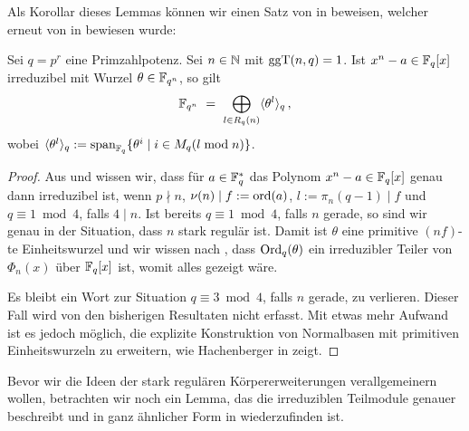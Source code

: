 Als Korollar dieses Lemmas können wir einen Satz von \citeauthor{semaev:1989}
\citeyear{semaev:1989} in 
\autocite{semaev:1989} beweisen, welcher erneut von \citeauthor{gao:1997}
\citeyear{gao:1997} in \autocite{gao:1997} bewiesen wurde:

\begin{satz}
  \label{satz:gao1}
  Sei $q = p^r$ eine Primzahlpotenz. Sei $n \in \mathbb{N}$ mit $\operatorname{ggT}(n,q)=1$.
  Ist $x^n - a \in \mathbb{F}_q[x]$ irreduzibel mit Wurzel $\theta\in \mathbb{F}_{q^n}$, so
  gilt 
  \[ \mathbb{F}_{q^n} \ =\  \bigoplus_{l\in R_q(n)} \langle \theta^l\rangle_q\,,\]
  wobei $\langle \theta^l\rangle_q := 
  \operatorname{span}_{\mathbb{F}_q}\{ \theta^i \mid i\in M_q(l\bmod n)\}$.
\end{satz}
\begin{proof}
  Aus  und 
  wissen wir, dass für $a \in \mathbb{F}_q^\ast$ das Polynom
  $x^n-a \in \mathbb{F}_q[x]$ genau dann irreduzibel ist, wenn
  $p\nmid n$, $\nu(n) \mid f := \operatorname{ord}(a)$, $l := \pi_n(q-1)\mid f$ und
  $q \equiv 1 \bmod 4$, falls $4\mid n$. 
  Ist bereits $q\equiv 1 \bmod 4$, falls $n$ gerade, so sind wir genau in der 
  Situation, dass $n$ stark regulär ist.
  Damit ist $\theta$ eine primitive $(nf)$-te Einheitswurzel und wir wissen
  nach , dass
  $\operatorname{Ord}_q(\theta)$ ein irreduzibler Teiler von $\Phi_n(x)$ über $\mathbb{F}_q[x]$ ist,
  womit alles gezeigt wäre.

  Es bleibt ein Wort zur Situation $q\equiv 3 \bmod 4$, falls $n$ gerade, zu
  verlieren. Dieser Fall wird von den bisherigen Resultaten nicht erfasst.
  Mit etwas mehr Aufwand ist es jedoch möglich, die explizite Konstruktion 
  von Normalbasen mit primitiven Einheitswurzeln zu erweitern, wie Hachenberger
  in \autocite[Section 22]{hachenberger1997finite} zeigt.
\end{proof}

Bevor wir die Ideen der stark regulären Körpererweiterungen verallgemeinern
wollen, betrachten wir noch ein Lemma, das die irreduziblen Teilmodule genauer
beschreibt und in ganz ähnlicher Form in \autocite[Theorem
22.5]{hachenberger1997finite} wiederzufinden ist.


